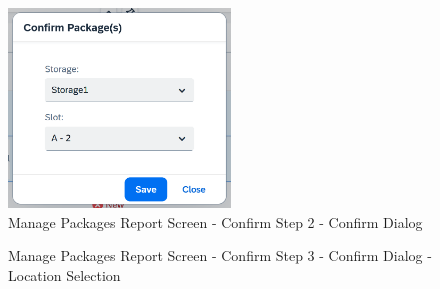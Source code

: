 \begin{figure}[H]
	\centering
	\includegraphics[height=150pt]{images/user_doc/managePack/ReportScreen/confirm/confirmDialog.png}
	\caption{Manage Packages Report Screen - Confirm Step 2 - Confirm Dialog}
	\label{fig:MPReportConfirmDlg}
\end{figure}

\begin{figure}[H]
	\centering
	\hspace{5pt}
    \caption{Manage Packages Report Screen - Confirm Step 3 - Confirm Dialog - Location Selection}
	\label{fig:MPReportConfirmDlgSelection}
\end{figure}

